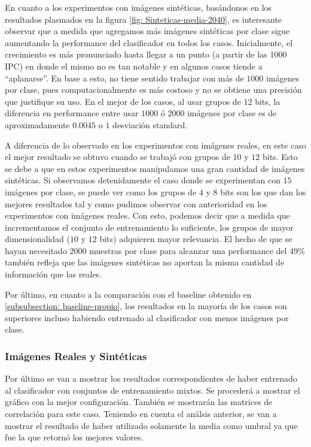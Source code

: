 	En cuanto a los experimentos con imágenes sintéticas, basándonos en los resultados plasmados en la figura \ref{fig: Sinteticas-media-2040}, es interesante observar que a medida que agregamos más imágenes sintéticas por clase sigue aumentando la performance del clasificador en todos los casos. Inicialmente, el crecimiento es más pronunciado hasta llegar a un punto (a partir de las 1000 IPC) en donde el mismo no es tan notable y en algunos casos tiende a ``aplanarse''. En base a esto, no tiene sentido trabajar con más de $1000$ imágenes por clase, pues computacionalmente es más costoso y no se obtiene una precisión que justifique su uso. En el mejor de los casos, al usar grupos de $12$ bits, la diferencia en performance entre usar $1000$ ó $2000$ imágenes por clase es de aproximadamente $0.0045$ o $1$ desviación standard.
	
	A diferencia de lo observado en los experimentos con imágenes reales, en este caso el mejor resultado se obtuvo cuando se trabajó con grupos de $10$ y $12$ bits. Esto se debe a que en estos experimentos manipulamos una gran cantidad de imágenes sintéticas. Si observamos detenidamente el caso donde se experimentan con $15$ imágenes por clase, se puede ver como los grupos de $4$ y $8$ bits son los que dan los mejores resultados tal y como pudimos observar con anterioridad en los experimentos con imágenes reales. Con esto, podemos decir que a medida que incrementamos el conjunto de entrenamiento lo suficiente, los grupos de mayor dimensionalidad ($10$ y $12$ bits) adquieren mayor relevancia. El hecho de que se hayan necesitado $2000$ muestras por clase para alcanzar una performance del $49\%$ también refleja que las imágenes sintéticas no aportan la misma cantidad de información que las reales. 
	
	Por último, en cuanto a la comparación con el baseline obtenido en \ref{subsubsection: baseline-propio}, los resultados en la mayoría de los casos son superiores incluso habiendo entrenado al clasificador con menos imágenes por clase.
			
\newpage
    	\subsubsection{Imágenes Reales y Sintéticas}
    	
	Por último se van a mostrar los resultados correspondientes de haber entrenado al clasificador con conjuntos de entrenamiento mixtos. Se procederá a mostrar el gráfico con la mejor configuración. También se mostrarán las matrices de correlación para este caso. Teniendo en cuenta el análsis anterior, se van a mostrar el resultado de haber utilizado solamente la media como umbral ya que fue la que retornó los mejores valores.
	
